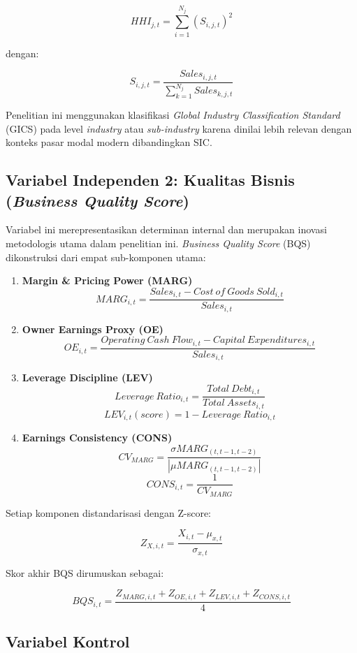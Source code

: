 \documentclass[12pt,a4paper]{report}
\begin{document}
\[
HHI_{j,t} = \sum_{i=1}^{N_j} (S_{i,j,t})^2
\]

dengan:

\[
S_{i,j,t} = \frac{Sales_{i,j,t}}{\sum_{k=1}^{N_j} Sales_{k,j,t}}
\]

Penelitian ini menggunakan klasifikasi \textit{Global Industry Classification Standard} (GICS) pada level \textit{industry} atau \textit{sub-industry} karena dinilai lebih relevan dengan konteks pasar modal modern dibandingkan SIC.

\subsection{Variabel Independen 2: Kualitas Bisnis (\textit{Business Quality Score})}

Variabel ini merepresentasikan determinan internal dan merupakan inovasi metodologis utama dalam penelitian ini. \textit{Business Quality Score} (BQS) dikonstruksi dari empat sub-komponen utama:

\begin{enumerate}
    \item \textbf{Margin \& Pricing Power (MARG)}
    \[
    MARG_{i,t} = \frac{Sales_{i,t} - Cost\ of\ Goods\ Sold_{i,t}}{Sales_{i,t}}
    \]
    \item \textbf{Owner Earnings Proxy (OE)}
    \[
    OE_{i,t} = \frac{Operating\ Cash\ Flow_{i,t} - Capital\ Expenditures_{i,t}}{Sales_{i,t}}
    \]
    \item \textbf{Leverage Discipline (LEV)}
    \[
    Leverage\ Ratio_{i,t} = \frac{Total\ Debt_{i,t}}{Total\ Assets_{i,t}}
    \]
    \[
    LEV_{i,t}(score) = 1 - Leverage\ Ratio_{i,t}
    \]
    \item \textbf{Earnings Consistency (CONS)}
    \[
    CV_{MARG} = \frac{\sigma MARG_{(t,t-1,t-2)}}{|\mu MARG_{(t,t-1,t-2)}|}
    \]
    \[
    CONS_{i,t} = \frac{1}{CV_{MARG}}
    \]
\end{enumerate}

Setiap komponen distandarisasi dengan Z-score:

\[
Z_{X,i,t} = \frac{X_{i,t} - \mu_{x,t}}{\sigma_{x,t}}
\]

Skor akhir BQS dirumuskan sebagai:

\[
BQS_{i,t} = \frac{Z_{MARG,i,t} + Z_{OE,i,t} + Z_{LEV,i,t} + Z_{CONS,i,t}}{4}
\]

\subsection{Variabel Kontrol}
\end{document}

